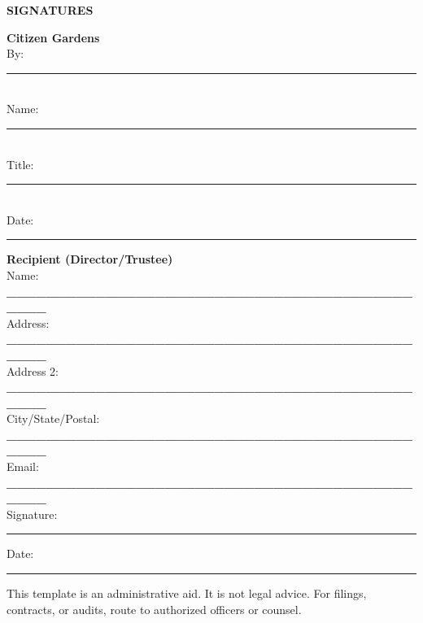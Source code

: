 \documentclass[11pt]{article}
\begin{document}
\vspace{1em}
\textbf{SIGNATURES}

\textbf{Citizen Gardens}\\
By: \rule{2.5in}{0.4pt}\\
Name: \rule{2.5in}{0.4pt}\\
Title: \rule{2.5in}{0.4pt}\\
Date: \rule{2.5in}{0.4pt}

\vspace{1em}
\textbf{Recipient (Director/Trustee)}\\
Name: \textbf{_____________________________________________}\\
Address: \textbf{_____________________________________________}\\
Address 2: \textbf{_____________________________________________}\\
City/State/Postal: \textbf{_____________________________________________}\\
Email: \textbf{_____________________________________________}\\
Signature: \rule{2.5in}{0.4pt}\hfill Date: \rule{1.5in}{0.4pt}

\vfill
{\footnotesize
This template is an administrative aid. It is not legal advice. For filings, contracts, or audits, route to authorized officers or counsel.%
}
\end{document}
